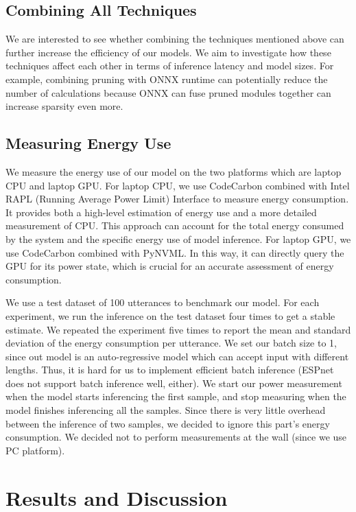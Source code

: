 \documentclass[11pt]{article}
\begin{document}
\subsection{Combining All Techniques}

We are interested to see whether combining the techniques mentioned above can further increase the efficiency of our models.
We aim to investigate how these techniques affect each other in terms of inference latency and model sizes.
For example, combining pruning with ONNX runtime can potentially reduce the number of calculations because ONNX can fuse pruned modules together can increase sparsity even more.

\subsection{Measuring Energy Use}
We measure the energy use of our model on the two platforms which are laptop CPU and laptop GPU. For laptop CPU, we use CodeCarbon combined with Intel RAPL (Running Average Power Limit) Interface to measure energy consumption. It provides both a high-level estimation of energy use and a more detailed measurement of CPU. This approach can account for the total energy consumed by the system and the specific energy use of model inference. For laptop GPU, we use CodeCarbon combined with PyNVML. In this way, it can directly query the GPU for its power state, which is crucial for an accurate assessment of energy consumption.

We use a test dataset of 100 utterances to benchmark our model. For each experiment, we run the inference on the test dataset four times to get a stable estimate. We repeated the experiment five times to report the mean and standard deviation of the energy consumption per utterance. We set our batch size to 1, since out model is an auto-regressive model which can accept input with different lengths. Thus, it is hard for us to implement efficient batch inference (ESPnet does not support batch inference well, either). We start our power measurement when the model starts inferencing the first sample, and stop measuring when the model finishes inferencing all the samples. Since there is very little overhead between the inference of two samples, we decided to ignore this part's energy consumption. We decided not to perform measurements at the wall (since we use PC platform).

\section{Results and Discussion}
\end{document}
